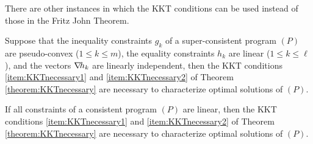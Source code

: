 \separator

There are other instances in which the KKT conditions can be used instead of those in the Fritz John Theorem.

\begin{theorem}\label{theorem:Slater}
Suppose that the inequality constraints $g_k$ of a super-consistent program $(P)$ are pseudo-convex ($1\leq k \leq m$), the equality constraints $h_k$ are linear ($1\leq k \leq \ell$), and the vectors $\mathop{\nabla\! {h_k}}$ are linearly independent, then the KKT conditions \ref{item:KKTnecessary1} and \ref{item:KKTnecessary2} of Theorem \ref{theorem:KKTnecessary} are necessary to characterize optimal solutions of $(P)$.
\end{theorem}

\begin{theorem}\label{theorem:KKTAllLinear}
If all constraints of a consistent program $(P)$ are linear, then the KKT conditions \ref{item:KKTnecessary1} and \ref{item:KKTnecessary2} of Theorem \ref{theorem:KKTnecessary} are necessary to characterize optimal solutions of $(P)$.
\end{theorem}